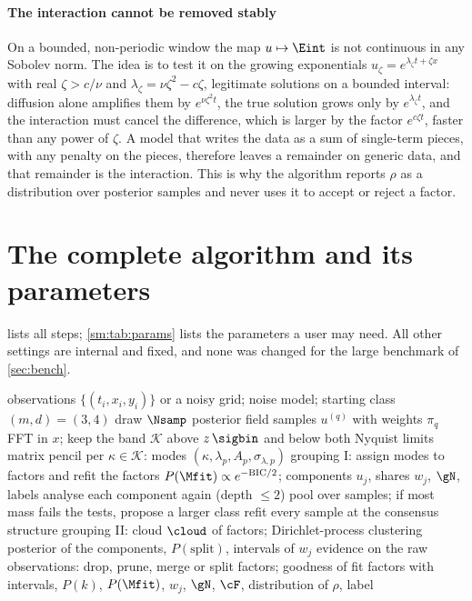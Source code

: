 \paragraph{The interaction cannot be removed stably} On a bounded, non-periodic window the map $u\mapsto\Eint$ is not
continuous in any Sobolev norm. The idea is to test it on the growing exponentials $u_\zeta=e^{\lambda_\zeta t+\zeta x}$ with
real $\zeta>c/\nu$ and $\lambda_\zeta=\nu\zeta^2-c\zeta$, legitimate solutions on a bounded interval: diffusion alone amplifies
them by $e^{\nu\zeta^2t}$, the true solution grows only by $e^{\lambda_\zeta t}$, and the interaction must cancel the difference,
which is larger by the factor $e^{c\zeta t}$, faster than any power of $\zeta$. A model that writes the data as a sum of
single-term pieces, with any penalty on the pieces, therefore leaves a remainder on generic data, and that remainder is
the interaction. This is why the algorithm reports $\rho$ as a distribution over posterior samples and never uses it to
accept or reject a factor.

\section{The complete algorithm and its parameters}\label{sm:algo}
 lists all steps; \cref{sm:tab:params} lists the parameters a user may need. All other settings are
internal and fixed, and none was changed for the large benchmark of \cref{sec:bench}.

\begin{algorithm}[htbp]
\caption{Learning a constant-coefficient PDE by grouping its modes}\label{sm:alg:full}
\begin{algorithmic}[1]
\Require observations $\{(t_i,x_i,y_i)\}$ or a noisy grid; noise model; starting class $(m,d)=(3,4)$
\State draw $\Nsamp$ posterior field samples $u^{(q)}$ with weights $\pi_q$ 
\Repeat {}
    \State FFT in $x$; keep the band $\mathcal K$ above $z\,\sigbin$ and below both Nyquist limits
    \State matrix pencil per $\kappa\in\mathcal K$: modes $(\kappa,\lambda_p,A_p,\sigma_{\lambda,p})$
      \State grouping I: assign modes to factors and refit the factors 
    \EndFor
    \State $P(\Mfit)\propto e^{-\mathrm{BIC}/2}$; components $u_j$, shares $w_j$, $\gN$, labels
    \State analyse each component again (depth $\le2$)
  \EndFor
  \State pool over samples; if most mass fails the tests, propose a larger class
\State refit every sample at the consensus structure
\State grouping II: cloud $\cloud$ of factors; Dirichlet-process clustering 
\State posterior of the components, $P(\text{split})$, intervals of $w_j$
\State evidence on the raw observations: drop, prune, merge or split factors; goodness of fit 
\State \Return factors with intervals, $P(k)$, $P(\Mfit)$, $w_j$, $\gN$, $\cF$, distribution of $\rho$, label
\end{algorithmic}
\end{algorithm}

